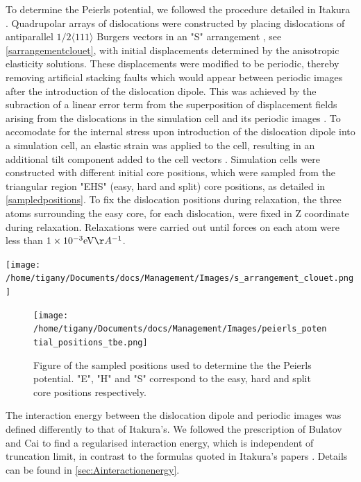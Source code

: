 \documentclass[a4paper,11pt]{article}
\begin{document}
To determine the Peierls potential, we followed the procedure detailed in Itakura
\cite{Itakura2012}. Quadrupolar arrays of dislocations were constructed by placing dislocations of
antiparallel \(1/2\langle 111\rangle\) Burgers vectors in an "S" arrangement \cite{Clouet2012}, see
\ref{sarrangementclouet}, with initial displacements determined by the anisotropic elasticity
solutions. These displacements were modified to be periodic, thereby removing artificial stacking
faults which would appear between periodic images after the introduction of the dislocation
dipole. This was achieved by the subraction of a linear error term from the superposition of
displacement fields arising from the dislocations in the simulation cell and its periodic images
\cite{vasilybulatov2006}. To accomodate for the internal stress upon introduction of the
dislocation dipole into a simulation cell, an elastic strain was applied to the cell, resulting
in an additional tilt component added to the cell vectors
\cite{Clouet2012,vasilybulatov2006}. Simulation cells were constructed with different initial core
positions, which were sampled from the triangular region "EHS" (easy, hard and split) core
positions, as detailed in \ref{sampledpositions}. To fix the dislocation positions during relaxation,
the three atoms surrounding the easy core, for each dislocation, were fixed in Z coordinate
during relaxation. Relaxations were carried out until forces on each atom were less than \(1\times10^{-3 }\text{eV}\AA^{-1}\).


\begin{center}
\texttt{[image: /home/tigany/Documents/docs/Management/Images/s\_arrangement\_clouet.png]}
\end{center}

\begin{figure}[htbp]
\centering
\texttt{[image: /home/tigany/Documents/docs/Management/Images/peierls\_potential\_positions\_tbe.png]}
\caption{\label{fig:org87dc895}
Figure of the sampled positions used to determine the the Peierls potential. "E", "H" and "S" correspond to the easy, hard and split core positions respectively.}
\end{figure}


The interaction energy between the dislocation dipole and periodic images was defined differently
to that of Itakura's. We followed the prescription of Bulatov and Cai \cite{vasilybulatov2006} to
find a regularised interaction energy, which is independent of truncation limit, in contrast to
the formulas quoted in Itakura's papers \cite{Itakura2012}. Details can be found in \ref{sec:Ainteractionenergy}.
\end{document}
